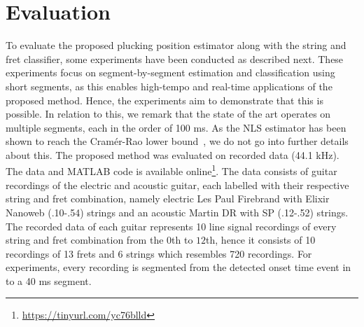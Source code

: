 \documentclass{article}
\begin{document}
\section{Evaluation} %
\label{sec:experiments}
To evaluate the proposed plucking position estimator along with the string and fret classifier, some experiments have been conducted as described next. These experiments focus on segment-by-segment estimation and classification using short segments, as this enables high-tempo and real-time applications of the proposed method. Hence, the experiments aim to demonstrate that this is possible. In relation to this, we remark that the state of the art \cite{barbancho:inharmonicity_tablature,michelson2018_aes} operates on multiple segments, each in the order of 100 ms. As the NLS estimator has been shown to reach the Cramér-Rao lower bound~\cite{nielsen2017fast}, we do not go into further details about this. The proposed method was evaluated on recorded data (44.1 kHz). The data and MATLAB code is available online\footnote{\url{https://tinyurl.com/yc76blld}}. The data consists of guitar recordings of the electric and acoustic guitar, each labelled with their respective string and fret combination, namely electric Les Paul Firebrand with Elixir Nanoweb (.10-.54) strings and an acoustic Martin DR with SP (.12-.52) strings. The recorded data of each guitar represents 10 line signal recordings of every string and fret combination from the $0$th to $12$th, hence it consists of 10 recordings of 13 frets and 6 strings which resembles 720 recordings. For experiments, every recording is segmented from the detected onset time event in to a 40 ms segment. %
%
%
%
%
%
%
\end{document}
